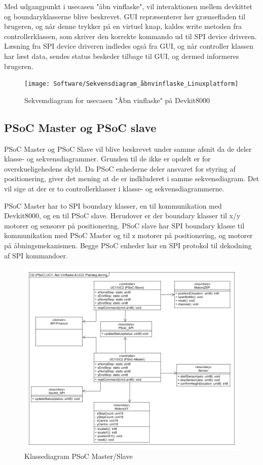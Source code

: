 Med udgangpunkt i usecasen "åbn vinflaske", vil interaktionen mellem devkittet og boundaryklasserne blive beskrevet. 
GUI repræsenterer her grænsefladen til brugeren, og når denne trykker på en virtuel knap, kaldes write metoden fra controllerklassen, som skriver den korrekte 
kommando ud til SPI device driveren. Læsning fra SPI device driveren indledes også fra GUI, og når controller klassen har læst data, sendes status beskeder 
tilbage til GUI, og dermed informeres brugeren.

\begin{figure}[H]
\texttt{[image: Software/Sekvensdiagram\_åbnvinflaske\_Linuxplatform]}
\caption{Sekvemdiagram for usecasen "Åbn vinflaske" på Devkit8000}
\end{figure}

\subsection{PSoC Master og PSoC slave}
PSoC Master og PSoC Slave vil blive beskrevet under samme afsnit da de deler klasse- og sekvensdiagrammer. 
Grunden til de ikke er opdelt er for overskueligehedens skyld. Da PSoC enhederne deler ansvaret for styring af positionering, giver det mening at de er 
indkluderet i samme sekvensdiagram. Det vil sige at der er to controllerklasser i klasse- og sekvensdiagrammerne. 

PSoC Master har to SPI boundary klasser, en til kommunikation med Devkit8000, og en til PSoC slave. Herudover er der boundary klasser til x/y motorer og 
sensorer på positionering. 
PSoC slave har SPI boundary klasse til kommunikation med PSoC Master og til z motorer på positionering, og motorer på åbningsmekanismen. Begge PSoC enheder har
en SPI protokol til dekodning af SPI kommandoer.

\begin{figure}[H]
\includegraphics[scale=0.8]{Software/Klassediagram_PSoC}
\caption{Klassediagram PSoC Master/Slave}
\end{figure}

